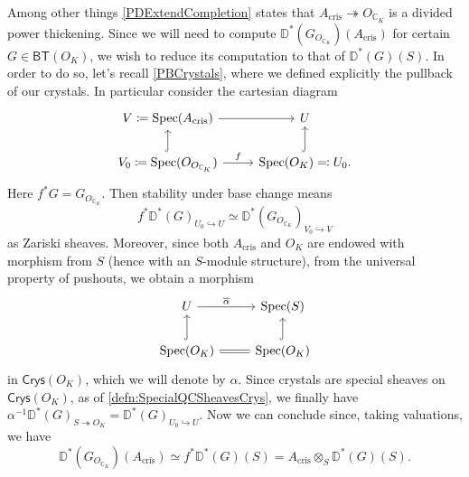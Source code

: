 \begin{rem}[]\label{BaseChangeAcris}
	Among other things \cref{PDExtendCompletion} states that
	$A_{\mathrm{cris}} \twoheadrightarrow O_{\mathbb{C}_K}$
	is a divided power thickening.
	Since we will need to compute $\mathbb{D}^*(G_{O_{\mathbb{C}_K}})(A_{\mathrm{cris}})$
	for certain $G \in \mathsf{BT}(O_K)$, we wish to
	reduce its computation to that of $\mathbb{D}^*(G)(S)$.
	In order to do so, let's recall \cref{PBCrystals}, where we
	defined explicitly the pullback of our crystals.
	In particular consider the cartesian diagram
	\begin{equation*}
	\begin{tikzcd}
		V \coloneqq \mathrm{Spec}(A_{\mathrm{cris}})
		\arrow[r, "", rightarrow] &
		U \\
		V_0 \coloneqq \mathrm{Spec}(O_{O_{\mathbb{C}_K}})
		\arrow[u, "", hookrightarrow] \arrow[r, "f", rightarrow] &
		\mathrm{Spec}(O_K) \eqqcolon U_0
		\arrow[u, "", hookrightarrow]
	.\end{tikzcd}
	\end{equation*}
	Here $f^*G = G_{O_{\mathbb{C}_K}}$.
	Then stability under base change means 
	\begin{equation*}
	f^* \mathbb{D}^*(G)_{U_0 \hookrightarrow U} \simeq
	\mathbb{D}^*(G_{O_{\mathbb{C}_K}})_{V_0 \hookrightarrow V}
	\end{equation*}
	as Zariski sheaves.
	Moreover, since both $A_{\mathrm{cris}}$ and $O_K$ are endowed
	with morphism from $S$ (hence with an $S$-module structure),
	from the universal property of pushouts, we obtain
	a morphism
	\begin{equation*}
	\begin{tikzcd}
		U \arrow[r, "\overline{\alpha}", rightarrow] &
		\mathrm{Spec}(S) \\
		\mathrm{Spec}(O_K)
		\arrow[u, "", hookrightarrow] \arrow[r, "", equals] &
		\mathrm{Spec}(O_K) \arrow[u, "", hookrightarrow] 
	\end{tikzcd}
	\end{equation*}
	in $\mathsf{Crys}(O_K)$, which we will denote by $\alpha$.
	Since crystals are special sheaves on $\mathsf{Crys}(O_K)$,
	as of \cref{defn:SpecialQCSheavesCrys},
	we finally have $\alpha^{-1} \mathbb{D}^*(G)_{S \twoheadrightarrow O_K} =
	\mathbb{D}^*(G)_{U_0 \hookrightarrow U}$.
	Now we can conclude since, taking valuations, we have
	\begin{equation*}
	\mathbb{D}^*(G_{O_{\mathbb{C}_K}})(A_{\mathrm{cris}}) \simeq
	f^* \mathbb{D}^*(G)(S) = A_{\mathrm{cris}} \otimes_S \mathbb{D}^*(G)(S)
	.\end{equation*}
\end{rem}


